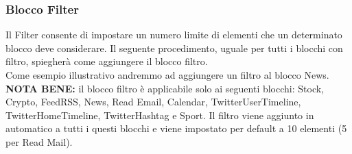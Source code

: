 \subsubsection{Blocco Filter} \label{filter}
Il Filter consente di impostare un numero limite di elementi che un determinato blocco deve considerare. 
Il seguente procedimento, uguale per tutti i blocchi con filtro, spiegherà come aggiungere il blocco filtro. \\
Come esempio illustrativo andremmo ad aggiungere un filtro al blocco News. \\
\textbf{NOTA BENE:} il blocco filtro è applicabile solo ai seguenti blocchi: Stock, Crypto, FeedRSS, News, Read Email, Calendar, TwitterUserTimeline, TwitterHomeTimeline, TwitterHashtag e Sport. Il filtro viene aggiunto in automatico a tutti i questi blocchi e viene impostato per default a 10 elementi (5 per Read Mail).
